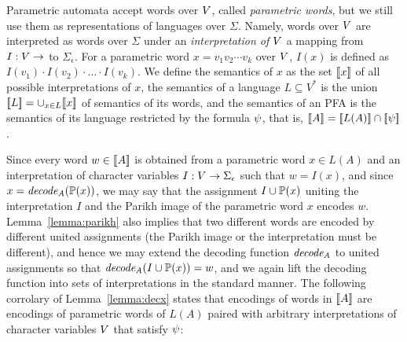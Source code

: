 \documentclass[sigplan,review,anonymous]{acmart}\settopmatter{printfolios=true,printccs=false,printacmref=false}
\begin{document}
%
%


Parametric automata accept words over $V$, called \emph{parametric words}, but we still use them as representations of languages over $\Sigma$. 
%
Namely, words over $V$ are interpreted as words over $\Sigma$ under an
\emph{interpretation of $V$}
%
a mapping from $I:V\rightarrow$ to $\Sigma_\epsilon$. For a parametric word $x= v_1v_2\cdots v_k$ over $V$, $I(x)$ is defined as $I(v_1)\cdot I(v_2)\cdot \ldots \cdot I(v_k)$.
%
We define the semantics of $x$ as the set $[\![x]\!]$ of all possible interpretations of $x$, the semantics of a language $L\subseteq V^*$ is the union $[\![L]\!] = \cup_{x\in L} [\![x]\!]$ of semantics of its words, and the semantics of an PFA is the semantics of its language restricted by the formula $\psi$, that is, $[\![A]\!] = [\![L(A)]\!]\cap[\![\psi]\!]$. 


Since every word $w \in [\![A]\!]$ is obtained from a parametric word $x\in L(A)$ and an interpretation of character variables $I:V\rightarrow\Sigma_\epsilon$ such that $w = I(x)$, and since $x = \mathit{decode_{A}}(\mathbb{P}{(x)})$, 
we may say that the assignment $I \cup \mathbb{P}{(x)}$ uniting the interpretation $I$ and the Parikh image of the parametric word $x$ encodes $w$. Lemma~\ref{lemma:parikh} also implies that two different words are encoded by different united assignments (the Parikh image or the interpretation must be different), and hence we may extend the decoding function $\mathit{decode_{A}}$ to united assignments so that $\mathit{decode_{A}}(I \cup \mathbb{P}{(x)}) = w$, and we again lift the decoding function into sets of interpretations in the standard manner.
The following corrolary of Lemma~\ref{lemma:decx} states that encodings of words in $[\![A]\!]$ are encodings of parametric words of $L(A)$ paired with arbitrary interpretations of character variables $V$ that satisfy $\psi$:%
%
\end{document}
